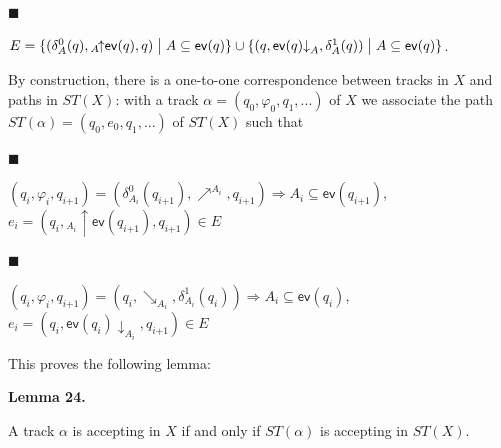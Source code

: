 \documentclass[10pt,a4paper]{article}
\begin{document}
 
 
\par\noindent  $\blacksquare$ 
 
$E={\{(\delta_{A}^{0}(q),{}_{A\!}{\uparrow}{\mathsf{ev}(q)},q)\mathrel{\big{|}}A\subseteq\mathsf{ev}(q)\}}\cup{\{(q,{\mathsf{ev}(q)}{\downarrow}_{A},\delta_{A}^{1}(q))\mathrel{\big{|}}A\subseteq\mathsf{ev}(q)\}}$.\par
 
 
  
By construction, there is a one-to-one correspondence between tracks in $X$ and paths in $ST(X)$: with a track $\alpha=(q_{0},\varphi_{0},q_{1},...)$ of $X$ we associate the path $ST(\alpha)=(q_{0},e_{0},q_{1},...)$ of $ST(X)$ such that\par
  
\par\noindent  $\blacksquare$ 
 
$(q_{i},\varphi_{i},q_{i\text{+}1})=(\delta_{A_{i}}^{0}(q_{i\text{+}1}),\mathrel{\nearrow^{A_{i}}},q_{i\text{+}1})\Rightarrow A_{i}\subseteq\mathsf{ev}(q_{i\text{+}1})$, $e_{i}=(q_{i},{}_{A_{i}\!}{\uparrow}{\mathsf{ev}(q_{i\text{+}1})},q_{i\text{+}1})\in E$\par
 
 
 
\par\noindent  $\blacksquare$ 
 
$(q_{i},\varphi_{i},q_{i\text{+}1})=(q_{i},\mathrel{\searrow_{A_{i}}},\delta_{A_{i}}^{1}(q_{i}))\Rightarrow A_{i}\subseteq\mathsf{ev}(q_{i})$, $e_{i}=(q_{i},{\mathsf{ev}(q_{i})}{\downarrow}_{A_{i}},q_{i\text{+}1})\in E$\par
 
 
  
This proves the following lemma:\par
 
 
 
\par\medskip\noindent\textbf{Lemma 24.}\par
 
 
A track $\alpha$ is accepting in $X$ if and only if $ST(\alpha)$ is accepting in $ST(X)$.\par
 
 
\end{document}

